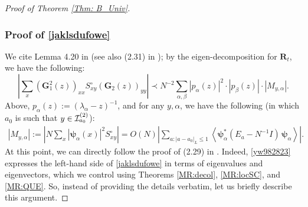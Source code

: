\begin{proof}[Proof of Theorem \ref{Thm: B_Univ}]
\subsubsection*{Proof of \eqref{jaklsdufowe}}
We cite Lemma 4.20 in \cite{Xu:2024aa} (see also (2.31) in \cite{YY_25}); by the eigen-decomposition for $\mathbf{R}_{t}$, we have the following:
\begin{equation}\label{yw982823}
        \left|\sum_{x}\left(\mathbf{G}_1^2(z)\right)_{xx} S_{x y}^{\circ}\left(\mathbf{G}_2(z)\right)_{yy}\right|\prec N^{-2}\sum_{\alpha,\beta} |p_\alpha(z)|^2 \cdot |p_\beta(z)|\cdot \left| M_{y,\alpha} \right|.
\end{equation}
Above, $p_{\alpha}(z):=(\lambda_{\alpha}-z)^{-1}$, and for any $y,\alpha$, we have the following (in which $a_{0}$ is such that $y\in{\cal I}^{(2)}_{a_{0}}$):
%
\begin{align*}
     |M_{y,\alpha}|:=\left|N \sum_{x}|\boldsymbol{\psi}_\alpha(x)|^2 S^{\circ}_{xy}\right|=O(N) \left|\sum_{a: |a-a_0|_{L}\le 1}
     \left\langle \boldsymbol{\psi}^*_\alpha \left(E_a-N^{-1} I\right) \,\boldsymbol{\psi}_\alpha\right\rangle\right|.
\end{align*}
%
At this point, we can directly follow the proof of (2.29) in \cite{YY_25}. Indeed, \eqref{yw982823} expresses the left-hand side of \eqref{jaklsdufowe} in terms of eigenvalues and eigenvectors, which we control using Theorems \ref{MR:decol}, \ref{MR:locSC}, and \ref{MR:QUE}. So, instead of providing the details verbatim, let us briefly describe this argument. 


\end{proof}
